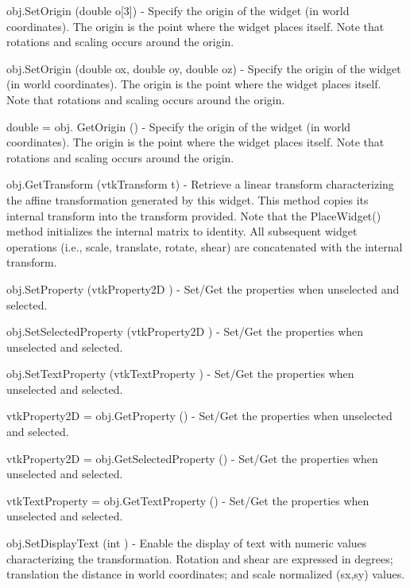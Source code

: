 \begin{DoxyItemize}
\item {\ttfamily obj.\-Set\-Origin (double o\mbox{[}3\mbox{]})} -\/ Specify the origin of the widget (in world coordinates). The origin is the point where the widget places itself. Note that rotations and scaling occurs around the origin.  
\item {\ttfamily obj.\-Set\-Origin (double ox, double oy, double oz)} -\/ Specify the origin of the widget (in world coordinates). The origin is the point where the widget places itself. Note that rotations and scaling occurs around the origin.  
\item {\ttfamily double = obj. Get\-Origin ()} -\/ Specify the origin of the widget (in world coordinates). The origin is the point where the widget places itself. Note that rotations and scaling occurs around the origin.  
\item {\ttfamily obj.\-Get\-Transform (vtk\-Transform t)} -\/ Retrieve a linear transform characterizing the affine transformation generated by this widget. This method copies its internal transform into the transform provided. Note that the Place\-Widget() method initializes the internal matrix to identity. All subsequent widget operations (i.\-e., scale, translate, rotate, shear) are concatenated with the internal transform.  
\item {\ttfamily obj.\-Set\-Property (vtk\-Property2\-D )} -\/ Set/\-Get the properties when unselected and selected.  
\item {\ttfamily obj.\-Set\-Selected\-Property (vtk\-Property2\-D )} -\/ Set/\-Get the properties when unselected and selected.  
\item {\ttfamily obj.\-Set\-Text\-Property (vtk\-Text\-Property )} -\/ Set/\-Get the properties when unselected and selected.  
\item {\ttfamily vtk\-Property2\-D = obj.\-Get\-Property ()} -\/ Set/\-Get the properties when unselected and selected.  
\item {\ttfamily vtk\-Property2\-D = obj.\-Get\-Selected\-Property ()} -\/ Set/\-Get the properties when unselected and selected.  
\item {\ttfamily vtk\-Text\-Property = obj.\-Get\-Text\-Property ()} -\/ Set/\-Get the properties when unselected and selected.  
\item {\ttfamily obj.\-Set\-Display\-Text (int )} -\/ Enable the display of text with numeric values characterizing the transformation. Rotation and shear are expressed in degrees; translation the distance in world coordinates; and scale normalized (sx,sy) values.  

\end{DoxyItemize}
